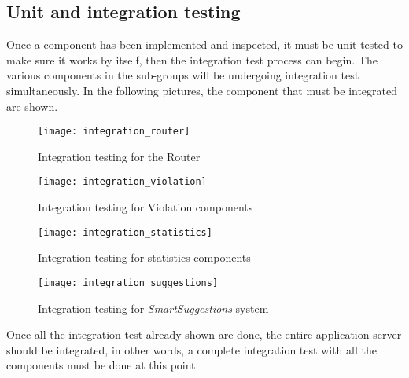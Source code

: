 \subsection{Unit and integration testing}
Once a component has been implemented and inspected, it must be unit tested to
make sure it works by itself, then the integration test process can begin. The
various components in the sub-groups will be undergoing integration test
simultaneously. In the following pictures, the component that must be integrated
are shown.

\begin{figure}[ht]
    \centering
    \texttt{[image: integration\_router]}
    \caption{Integration testing for the Router}
    \label{fig:integration_router}
\end{figure}

\begin{figure}[ht]
    \centering
    \texttt{[image: integration\_violation]}
    \caption{Integration testing for Violation components}
    \label{fig:integration_violation}
\end{figure}

\begin{figure}[ht]
    \centering
    \texttt{[image: integration\_statistics]}
    \caption{Integration testing for statistics components}
    \label{fig:integration_statistics}
\end{figure}

\clearpage
\begin{figure}[ht]
    \centering
    \texttt{[image: integration\_suggestions]}
    \caption{Integration testing for \emph{SmartSuggestions} system}
    \label{fig:integration_suggestions}
\end{figure}

Once all the integration test already shown are done, the entire application
server should be integrated, in other words, a complete integration test with
all the components must be done at this point.